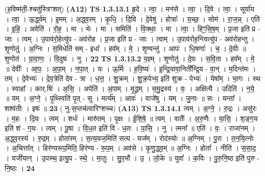\documentclass[17pt]{extarticle}
\begin{document}
                  \newline
                      (ह॒विष्म॑ती॒-श्चतु॑स्त्रिꣳशत्)  \textbf{(A12)} \newline \newline
                                \textbf{ TS 1.3.13.1} \newline
                  हृ॒दे । त्वा॒ । मन॑से । त्वा॒ । दि॒वे । त्वा॒ । सूर्या॑य । त्वा॒ । ऊ॒र्द्ध्वम् । इ॒मम् । अ॒द्ध्व॒रम् । कृ॒धि॒ । दि॒वि । दे॒वेषु॑ । होत्राः᳚ । य॒च्छ॒ । सोम॑ । रा॒ज॒न्न् । एति॑ । इ॒हि॒ । अवेति॑ । रो॒ह॒ । मा । भेः । मा । समिति॑ । वि॒क्थाः॒ । मा । त्वा॒ । हिꣳ॒॒सि॒ष॒म् । प्र॒जा इति॑ प्र - जाः । त्वम् । उ॒पाव॑रो॒हेत्यु॑प - अव॑रोह । प्र॒जा इति॑ प्र - जाः । त्वाम् । उ॒पाव॑रोह॒न्त्वित्यु॑प - अव॑रोहन्तु । शृ॒णोतु॑ । अ॒ग्निः । स॒मिधेति॑ सम् - इधा᳚ । हव᳚म् । मे॒ । शृ॒ण्वन्तु॑ । आपः॑ । धि॒षणाः᳚ । च॒ । दे॒वीः ॥ शृ॒णोत॑ । ग्रा॒वा॒णः॒ । वि॒दुषः॑ । नु । \textbf{  22} \newline
                  \newline
                                \textbf{ TS 1.3.13.2} \newline
                  य॒ज्ञ्म् । शृ॒णोतु॑ । दे॒वः । स॒वि॒ता । हव᳚म् । मे॒ ॥ देवीः᳚ । आ॒पः॒ । अ॒पा॒म् । न॒पा॒त् । यः । ऊ॒र्मिः । ह॒वि॒ष्यः॑ । इ॒न्द्रि॒यावा॒निती᳚न्द्रि॒य - वा॒न् । म॒दिन्त॑मः । तम् । दे॒वेभ्यः॑ । दे॒व॒त्रेति॑ देव - त्रा । ध॒त्त॒ । शु॒क्रम् । शु॒क्र॒पेभ्य॒ इति॑ शुक्र - पेभ्यः॑ । येषा᳚म् । भा॒गः । स्थ । स्वाहा᳚ । कार्.षिः॑ । अ॒सि॒ । अपेति॑ । अ॒पाम् । मृ॒द्ध्रम् । स॒मु॒द्रस्य॑ । वः॒ । अक्षि॑त्यै । उदिति॑ । न॒ये॒ ॥ यम् । अ॒ग्ने॒ । पृ॒थ्स्विति॑ पृ॒त् - सु । मर्त्य᳚म् । आवः॑ । वाजे॑षु । यम् । जु॒नाः ॥ सः । यन्ता᳚ । शश्व॑तीः । इषः॑ ॥ \textbf{  23} \newline
                  \newline
                      ( नु-स॒प्तच॑त्वारिꣳशच्च)  \textbf{(A13)} \newline \newline
                                \textbf{ TS 1.3.14.1} \newline
                  त्वम् । अ॒ग्ने॒ । रु॒द्रः । असु॑रः । म॒हः । दि॒वः । त्वम् । शर्धः॑ । मारु॑तम् । पृ॒क्षः । ई॒शि॒षे॒ ॥ त्वम् । वातैः᳚ । अ॒रु॒णैः । या॒सि॒ । श॒ङ्ग॒य इति॑ शं - ग॒यः । त्वम् । पू॒षा । वि॒ध॒त इति॑ वि - ध॒तः । पा॒सि॒ । नु । त्मना᳚ ॥ एति॑ । वः॒ । राजा॑नम् । अ॒द्ध्व॒रस्य॑ । रु॒द्रम् । होता॑रम् । स॒त्य॒यज॒मिति॑ सत्य - यज᳚म् । रोद॑स्योः ॥ अ॒ग्निम् । पु॒रा । त॒न॒यि॒त्नोः । अ॒चित्ता᳚त् । हिर॑ण्यरूप॒मिति॒ हिर॑ण्य - रू॒प॒म् । अव॑से । कृ॒णु॒द्ध्व॒म् ॥ अ॒ग्निः । होता᳚ । नीति॑ । स॒सा॒द॒ । यजी॑यान् । उ॒पस्थ॒ इत्यु॒प - स्थे॒ । मा॒तुः । सु॒र॒भौ । उ॒ । लो॒के ॥ युवा᳚ । क॒विः । पु॒रु॒नि॒ष्ठ इति॑ पुरु - नि॒ष्ठः । \textbf{  24} \newline
\end{document}

